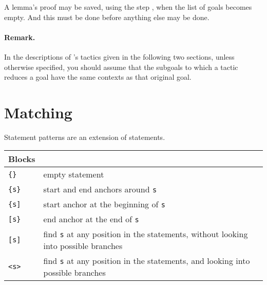 A lemma's proof may be saved, using the step , when the list
of goals becomes empty. And this must be done before anything else may
be done.

\paragraph{Remark.}
In the descriptions of \EasyCrypt's tactics given in the following two
sections, unless otherwise specified, you should assume that the
subgoals to which a tactic reduces a goal have the same contexts as
that original goal.

\section{Matching}

Statement patterns are an extension of statements.  

\begin{tabular}{| l | l |}
  \hline
  Blocks & \\
  \hline
  \texttt{\{\}}  & empty statement \\
  \texttt{\{s\}} & start and end anchors around \texttt{s} \\
  \texttt{\{s]}  & start anchor at the beginning of \texttt{s} \\
  \texttt{[s\}}  & end anchor at the end of \texttt{s} \\
  \texttt{[s]}   & find \texttt{s} at any position in the statements, 
                  without looking into possible branches \\
  \texttt{<s>}   & find \texttt{s} at any position in the statements, 
                  and looking into possible branches \\
  \hline
\end{tabular}

